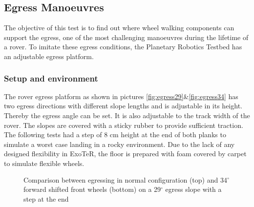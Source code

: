 \documentclass[a4paper,twocolumn]{esapub2005} %
\begin{document}
\subsection{Egress Manoeuvres}
The objective of this test is to find out where wheel walking components can support the egress, one of the most challenging manoeuvres during the lifetime of a rover. To imitate these egress conditions, the Planetary Robotics Testbed has an adjustable egress platform.


\subsubsection{Setup and environment}
The rover egress platform as shown in pictures \ref{fig:egress29}\&\ref{fig:egress34} has two egress directions with different slope lengths and is adjustable in its height. Thereby the egress angle can be set. It is also adjustable to the track width of the rover. The slopes are covered with a sticky rubber to provide sufficient traction. The following tests had a step of 8 cm height at the end of both planks to simulate a worst case landing in a rocky environment. 
Due to the lack of any designed flexibility in ExoTeR, the floor is prepared with foam covered by carpet to simulate flexible wheels.
\begin{figure}[h]
	\centering
	\caption{Comparison between egressing in normal configuration (top) and 34$^{\circ}$ forward shifted front wheels (bottom) on a 29$^{\circ}$ egress slope with a step at the end}
	\label{fig:egress29com}
\end{figure}
\end{document}
